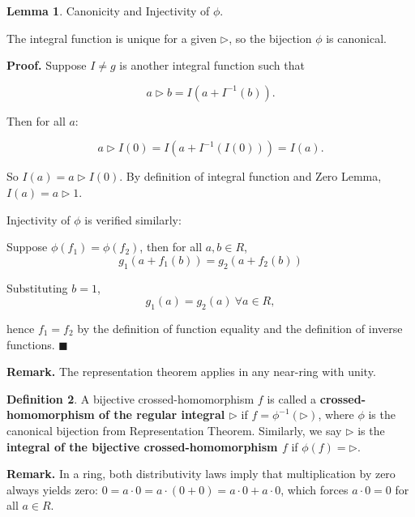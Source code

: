 \documentclass[12pt]{article}
\theoremstyle{definition}
\newtheorem{definition}{Definition}[section]
\newtheorem{lemma}[definition]{Lemma}
\begin{document}
\vspace{10pt}
\begin{lemma} Canonicity and Injectivity of $\phi$.

\vspace{5pt}
\noindent The integral function is unique for a given $\triangleright$, so the bijection $\phi$ is canonical.

\vspace{5pt}
\noindent\textbf{Proof.} Suppose $I \neq g$ is another integral function such that  

\[
a \triangleright b = I(a + I^{-1}(b)).
\]  

Then for all $a$:  

\[
a \triangleright I(0) = I(a + I^{-1}(I(0))) = I(a).
\]  

So $I(a) = a \triangleright I(0)$. By definition of integral function and Zero Lemma, $I(a) = a \triangleright 1$. 

\vspace{5pt}
Injectivity of $\phi$ is verified similarly: 

\vspace{5pt}
Suppose $\phi(f_1) = \phi(f_2)$, then for all $a, b \in R$,
\[
g_1(a + f_1(b)) = g_2(a + f_2(b))
\]

Substituting $b = 1$,
\[
g_1(a) = g_2(a) \ \forall a \in R,
\]

hence $f_1 = f_2$ by the definition of function equality and the definition of inverse functions. $\blacksquare$

\end{lemma}

\newpage
\noindent\textbf{Remark.} The representation theorem applies in any near-ring with unity.

\begin{definition} A bijective crossed-homomorphism $f$ is called a \textbf{crossed-homomorphism of the regular integral $\triangleright$} if $f = \phi^{-1}(\triangleright)$, where $\phi$ is the canonical bijection from Representation Theorem. Similarly, we say $\triangleright$ is the \textbf{integral of the bijective crossed-homomorphism $f$} if $\phi(f) = \triangleright$.
\end{definition}

\vspace{10pt}

\noindent\textbf{Remark.} In a ring, both distributivity laws imply that multiplication by zero always yields zero: 
$0 = a \cdot 0 = a \cdot (0 + 0) = a \cdot 0 + a \cdot 0$, which forces $a \cdot 0 = 0$ for all $a \in R$. 
\end{document}
